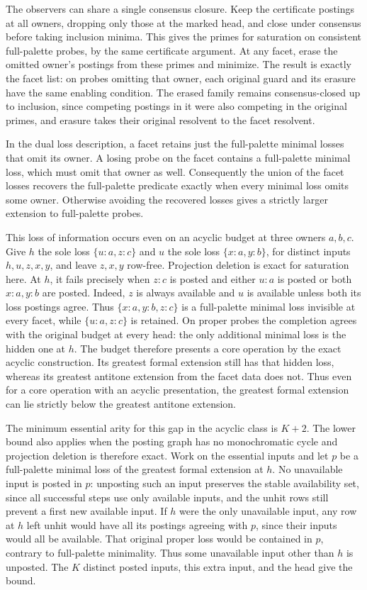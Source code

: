The observers can share a single consensus closure.
Keep the certificate postings at all owners,
dropping only those at the marked head, and close
under consensus before taking inclusion minima.
This gives the primes for saturation on consistent
full-palette probes, by the same certificate
argument. At any facet, erase the omitted owner's
postings from these primes and minimize. The result
is exactly the facet list: on probes omitting that
owner, each original guard and its erasure have the
same enabling condition. The erased family remains
consensus-closed up to inclusion, since competing
postings in it were also competing in the original
primes, and erasure takes their original resolvent
to the facet resolvent.

In the dual loss description, a facet retains just
the full-palette minimal losses that omit its owner.
A losing probe on the facet contains a full-palette
minimal loss, which must omit that owner as well.
Consequently the union of the facet losses recovers
the full-palette predicate exactly when every
minimal loss omits some owner. Otherwise avoiding
the recovered losses gives a strictly larger
extension to full-palette probes.

This loss of information occurs even on an acyclic
budget at three owners $a,b,c$. Give $h$ the sole
loss $\{u:a,z:c\}$ and $u$ the sole loss
$\{x:a,y:b\}$, for distinct inputs $h,u,z,x,y$,
and leave $z,x,y$ row-free. Projection deletion
is exact for saturation here. At $h$, it fails
precisely when $z:c$ is posted and either $u:a$
is posted or both $x:a,y:b$ are posted. Indeed,
$z$ is always available and $u$ is available
unless both its loss postings agree. Thus
$\{x:a,y:b,z:c\}$ is a full-palette minimal loss
invisible at every facet, while $\{u:a,z:c\}$
is retained. On proper probes the completion
agrees with the original budget at every head:
the only additional minimal loss is the hidden
one at $h$. The budget therefore presents a core
operation by the exact acyclic construction.
Its greatest formal extension still has that
hidden loss, whereas its greatest antitone
extension from the facet data does not. Thus
even for a core operation with an acyclic
presentation, the greatest formal extension
can lie strictly below the greatest antitone
extension.

The minimum essential arity for this gap in
the acyclic class is $K+2$. The lower bound
also applies when the posting graph has no
monochromatic cycle and projection deletion
is therefore exact. Work on the essential
inputs and let $p$ be a full-palette minimal
loss of the greatest formal extension at
$h$. No unavailable input is posted in $p$:
unposting such an input preserves the stable
availability set, since all successful steps
use only available inputs, and the unhit rows
still prevent a first new available input.
If $h$ were the only unavailable input,
any row at $h$ left unhit would have all
its postings agreeing with $p$, since their
inputs would all be available. That original
proper loss would be contained in $p$,
contrary to full-palette minimality. Thus
some unavailable input other than $h$ is
unposted. The $K$ distinct posted inputs,
this extra input, and the head give the bound.

